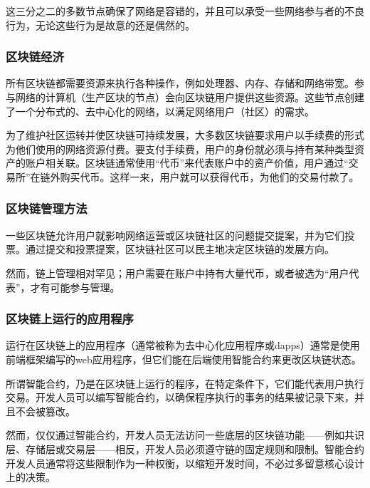 这三分之二的多数节点确保了网络是容错的，并且可以承受一些网络参与者的不良行为，无论这些行为是故意的还是偶然的。

\hypertarget{ux533aux5757ux94feux7ecfux6d4e}{%
\subsubsection{区块链经济}\label{ux533aux5757ux94feux7ecfux6d4e}}

所有区块链都需要资源来执行各种操作，例如处理器、内存、存储和网络带宽。参与网络的计算机（生产区块的节点）会向区块链用户提供这些资源。这些节点创建了一个分布式的、去中心化的网络，以满足网络用户（社区）的需求。

为了维护社区运转并使区块链可持续发展，大多数区块链要求用户以手续费的形式为他们使用的网络资源付费。要支付手续费，用户的身份就必须与持有某种类型资产的账户相关联。区块链通常使用``代币''来代表账户中的资产价值，用户通过``交易所''在链外购买代币。这样一来，用户就可以获得代币，为他们的交易付款了。

\hypertarget{ux533aux5757ux94feux7ba1ux7406ux65b9ux6cd5}{%
\subsubsection{区块链管理方法}\label{ux533aux5757ux94feux7ba1ux7406ux65b9ux6cd5}}

一些区块链允许用户就影响网络运营或区块链社区的问题提交提案，并为它们投票。通过提交和投票提案，区块链社区可以民主地决定区块链的发展方向。

然而，链上管理相对罕见；用户需要在账户中持有大量代币，或者被选为``用户代表''，才有可能参与管理。

\hypertarget{ux533aux5757ux94feux4e0aux8fd0ux884cux7684ux5e94ux7528ux7a0bux5e8f}{%
\subsubsection{区块链上运行的应用程序}\label{ux533aux5757ux94feux4e0aux8fd0ux884cux7684ux5e94ux7528ux7a0bux5e8f}}

运行在区块链上的应用程序（通常被称为去中心化应用程序或dapps）通常是使用前端框架编写的web应用程序，但它们能在后端使用智能合约来更改区块链状态。

所谓智能合约，乃是在区块链上运行的程序，在特定条件下，它们能代表用户执行交易。开发人员可以编写智能合约，以确保程序执行的事务的结果被记录下来，并且不会被篡改。

然而，仅仅通过智能合约，开发人员无法访问一些底层的区块链功能------例如共识层、存储层或交易层------相反，开发人员必须遵守链的固定规则和限制。智能合约开发人员通常将这些限制作为一种权衡，以缩短开发时间，不必过多留意核心设计上的决策。

